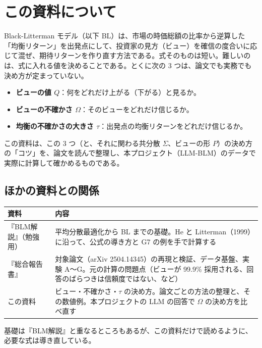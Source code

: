 \chapter*{この資料について}

Black-Litterman モデル（以下 BL）は、市場の時価総額の比率から逆算した「均衡リターン」を出発点にして、投資家の見方（ビュー）を確信の度合いに応じて混ぜ、期待リターンを作り直す方法である。式そのものは短い。難しいのは、式に入れる値を決めることである。とくに次の 3 つは、論文でも実務でも決め方が定まっていない。

\begin{itemize}
\item \textbf{ビューの値 $Q$}：何をどれだけ上がる（下がる）と見るか。
\item \textbf{ビューの不確かさ $\Omega$}：そのビューをどれだけ信じるか。
\item \textbf{均衡の不確かさの大きさ $\tau$}：出発点の均衡リターンをどれだけ信じるか。
\end{itemize}

この資料は、この 3 つ（と、それに関わる共分散 $\Sigma$、ビューの形 $P$）の決め方の「コツ」を、論文を読んで整理し、本プロジェクト（LLM-BLM）のデータで実際に計算して確かめるものである。

\section*{ほかの資料との関係}

\begin{center}
\small
\begin{tabular}{p{3.0cm}p{10.6cm}}
\toprule
資料 & 内容 \\
\midrule
『BLM解説』（勉強用） & 平均分散最適化から BL までの基礎。He と Litterman（1999）に沿って、公式の導き方と G7 の例を手で計算する \\
『総合報告書』 & 対象論文（arXiv 2504.14345）の再現と検証、データ基盤、実験 A〜G。元の計算の問題点（ビューが 99.9\% 採用される、回答のばらつきは信頼度ではない、など） \\
この資料 & ビュー・不確かさ・$\tau$ の決め方。論文ごとの方法の整理と、その数値例。本プロジェクトの LLM の回答で $\Omega$ の決め方を比べ直す \\
\bottomrule
\end{tabular}
\end{center}

基礎は『BLM解説』と重なるところもあるが、この資料だけで読めるように、必要な式は導き直している。

